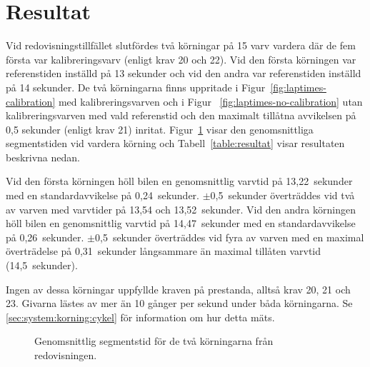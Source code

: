 \section{Resultat}

Vid redovisningstillfället slutfördes två körningar på 15 varv vardera där de
fem första var kalibreringsvarv (enligt krav 20 och 22). Vid den första
körningen var referenstiden inställd på 13 sekunder och vid den andra var
referenstiden inställd på 14 sekunder. De två körningarna finns uppritade i
Figur~\ref{fig:laptimes-calibration} med kalibreringsvarven och i Figur~
\ref{fig:laptimes-no-calibration} utan kalibreringsvarven med vald referenstid
och den maximalt tillåtna avvikelsen på 0,5 sekunder (enligt krav 21) inritat.
Figur~\ref{fig:segtimes} visar den genomsnittliga segmentstiden vid vardera
körning och Tabell~\ref{table:resultat} visar resultaten beskrivna nedan.

Vid den första körningen höll bilen en genomsnittlig varvtid på 13,22~sekunder
med en standardavvikelse på 0,24~sekunder. $\pm$0,5~sekunder överträddes vid två
av varven med varvtider på 13,54 och 13,52~sekunder. Vid den andra körningen höll bilen en genomsnittlig varvtid på 14,47~sekunder
med en standardavvikelse på 0,26~sekunder. $\pm$0,5~sekunder överträddes vid
fyra av varven med en maximal överträdelse på 0,31~sekunder långsammare än
maximal tillåten varvtid (14,5~sekunder).

Ingen av dessa körningar uppfyllde kraven på prestanda, alltså krav 20, 21 och
23. Givarna lästes av mer än 10 gånger per sekund under båda körningarna. Se
\ref{sec:system:korning:cykel} för information om hur detta mäts.

\begin{figure}
	\centering
	\caption{Genomsnittlig segmentstid för de två körningarna från redovisningen.}
	\label{fig:segtimes}
\end{figure}

